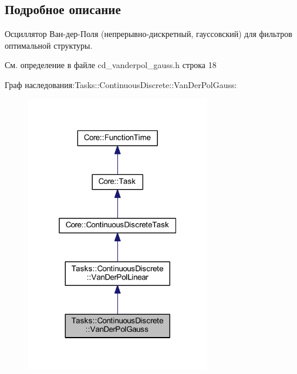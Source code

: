 \subsection{Подробное описание}
Осциллятор Ван-\/дер-\/Поля (непрерывно-\/дискретный, гауссовский) для фильтров оптимальной структуры. 

См. определение в файле cd\+\_\+vanderpol\+\_\+gauss.\+h строка 18



Граф наследования\+:Tasks\+:\+:Continuous\+Discrete\+:\+:Van\+Der\+Pol\+Gauss\+:\nopagebreak
\begin{figure}[H]
\begin{center}
\leavevmode
\includegraphics[width=229pt]{class_tasks_1_1_continuous_discrete_1_1_van_der_pol_gauss__inherit__graph}
\end{center}
\end{figure}


